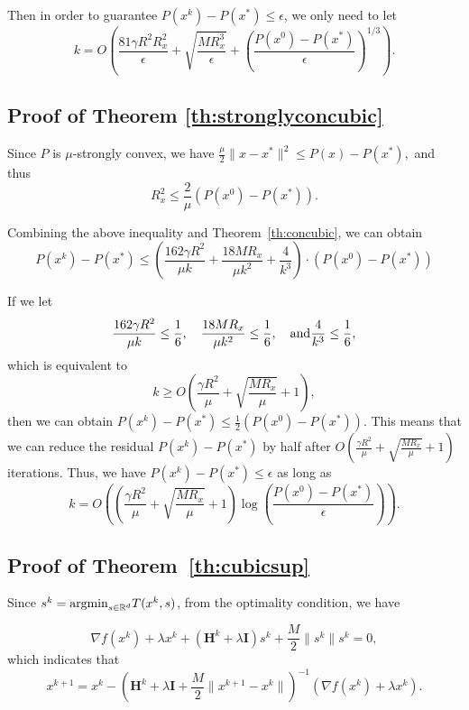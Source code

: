 \documentclass[12pt]{article}
\newcommand{\R}{\mathbb{R}}
\newcommand{\mH}{\mathbf{H}}
\newcommand{\mI}{\mathbf{I}}
\begin{document}
Then in order to guarantee $P(x^k) - P(x^*) \leq \epsilon$, we only need to let 
$$
k = O\left( \frac{81\gamma R^2 R_x^2}{\epsilon}  + \sqrt{\frac{MR_x^3}{\epsilon}} + \left(  \frac{P(x^0) - P(x^*)}{\epsilon}  \right)^{1/3}   \right). 
$$


\subsection{Proof of Theorem \ref{th:stronglyconcubic}}

Since $P$ is $\mu$-strongly convex, we have 
$
\frac{\mu}{2} \|x-x^*\|^2 \leq P(x) - P(x^*), 
$
and thus 
$$
R_x^2 \leq \frac{2}{\mu} (P(x^0) - P(x^*)). 
$$

Combining the above inequality and Theorem~\ref{th:concubic}, we can obtain 
$$
P(x^k) - P(x^*) \leq \left(  \frac{162\gamma R^2}{\mu k} +  \frac{18MR_x}{\mu k^2} + \frac{4}{ k^3}  \right) \cdot \left(  P(x^0) - P(x^*)  \right)
$$

If we let 
$$
\frac{162\gamma R^2}{\mu k} \leq \frac{1}{6}, \quad  \frac{18MR_x}{\mu k^2} \leq \frac{1}{6}, \quad {\rm and} \frac{4}{ k^3}  \leq \frac{1}{6}, 
$$
which is equivalent to 
$$
k \geq O\left(  \frac{\gamma R^2}{\mu} + \sqrt{\frac{MR_x}{\mu}} + 1 \right), 
$$
then we can obtain $P(x^k) - P(x^*) \leq \frac{1}{2} (P(x^0) - P(x^*))$. This means that we can reduce the residual $P(x^k)-P(x^*)$ by half after $O\left(  \frac{\gamma R^2}{\mu} + \sqrt{\frac{MR_x}{\mu}} + 1 \right)$ iterations. Thus, we have $P(x^k) - P(x^*) \leq \epsilon$ as long as 
$$
k = O\left( \left(  \frac{\gamma R^2}{\mu} + \sqrt{\frac{MR_x}{\mu}} + 1 \right) \log \left(  \frac{P(x^0) - P(x^*)}{\epsilon}  \right)   \right). 
$$



\subsection{Proof of Theorem~\ref{th:cubicsup}}

Since $s^k = {\rm argmin}_{s\in\R^d}T(x^k, s)$, from the optimality condition, we have 

$$
\nabla f(x^k) + \lambda x^k + (\mH^k + \lambda \mI)s^k  + \frac{M}{2}\|s^k\| s^k = 0, 
$$
which indicates that 
\begin{equation}\label{eq:xk+1im}
x^{k+1} = x^k - \left(  \mH^k + \lambda \mI + \frac{M}{2}\|x^{k+1} - x^k\| \right)^{-1} \left(  \nabla f(x^k) + \lambda x^k  \right). 
\end{equation}
\end{document}
